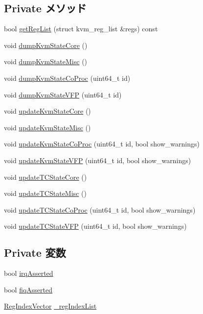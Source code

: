 \subsection*{Private メソッド}
\begin{DoxyCompactItemize}
\item 
bool \hyperlink{classArmKvmCPU_a8a90fa6e1883cd37fc5cd411a56331a7}{getRegList} (struct kvm\_\-reg\_\-list \&regs) const 
\item 
void \hyperlink{classArmKvmCPU_a54d58f77f2887428772599f7ddd8652e}{dumpKvmStateCore} ()
\item 
void \hyperlink{classArmKvmCPU_a7e82213fbf8527640f993114c92f97eb}{dumpKvmStateMisc} ()
\item 
void \hyperlink{classArmKvmCPU_a07eee5a82f9b81c1959175281ed1e12e}{dumpKvmStateCoProc} (uint64\_\-t id)
\item 
void \hyperlink{classArmKvmCPU_a3d102e15d4e84df462b8c31ec2f7ee0c}{dumpKvmStateVFP} (uint64\_\-t id)
\item 
void \hyperlink{classArmKvmCPU_ad705a24136d19a3497a77e57888e2111}{updateKvmStateCore} ()
\item 
void \hyperlink{classArmKvmCPU_a322cf85c38b68e9d2b62700eb61797f9}{updateKvmStateMisc} ()
\item 
void \hyperlink{classArmKvmCPU_a2647fd1f3839c4716dcec7ccfb567c33}{updateKvmStateCoProc} (uint64\_\-t id, bool show\_\-warnings)
\item 
void \hyperlink{classArmKvmCPU_ad423a1f901d535a33ee19130f1892350}{updateKvmStateVFP} (uint64\_\-t id, bool show\_\-warnings)
\item 
void \hyperlink{classArmKvmCPU_a72bbd13b32502607c6297268cace4868}{updateTCStateCore} ()
\item 
void \hyperlink{classArmKvmCPU_aa29d443c292712c817d1464fba8943d7}{updateTCStateMisc} ()
\item 
void \hyperlink{classArmKvmCPU_a398ea9eff7b6848bc2c92fe43999011d}{updateTCStateCoProc} (uint64\_\-t id, bool show\_\-warnings)
\item 
void \hyperlink{classArmKvmCPU_a94714d5528a5c80d1e0f9fe250514a07}{updateTCStateVFP} (uint64\_\-t id, bool show\_\-warnings)
\end{DoxyCompactItemize}
\subsection*{Private 変数}
\begin{DoxyCompactItemize}
\item 
bool \hyperlink{classArmKvmCPU_af61d21c5b06aff9f758f797b2c8d422f}{irqAsserted}
\item 
bool \hyperlink{classArmKvmCPU_a980f87872f421bd8c54c0f347ad8bfcc}{fiqAsserted}
\item 
\hyperlink{classstd_1_1vector}{RegIndexVector} \hyperlink{classArmKvmCPU_ada25a9ee0667e58ed655eec2be09b133}{\_\-regIndexList}
\end{DoxyCompactItemize}
